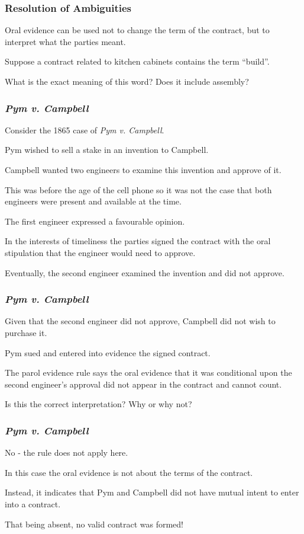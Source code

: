 \begin{frame}
\frametitle{Resolution of Ambiguities}

Oral evidence can be used not to change the term of the contract, but to interpret what the parties meant. 

Suppose a contract related to kitchen cabinets contains the term ``build''.

What is the exact meaning of this word? Does it include assembly? 

\end{frame}



\begin{frame}
\frametitle{\textit{Pym v. Campbell}}

Consider the 1865 case of \textit{Pym v. Campbell}.

Pym wished to sell a stake in an invention to Campbell. 

Campbell wanted two engineers to examine this invention and approve of it. 

This was before the age of the cell phone so it was not the case that both engineers were present and available at the time.

The first engineer expressed a favourable opinion.

In the interests of timeliness the parties signed the contract with the oral stipulation that the engineer would need to approve.

Eventually, the second engineer examined the invention and did not approve.

\end{frame}



\begin{frame}
\frametitle{\textit{Pym v. Campbell}}

Given that the second engineer did not approve, Campbell did not wish to purchase it.

Pym sued and entered into evidence the signed contract.

The parol evidence rule says the oral evidence that it was conditional upon the second engineer's approval did not appear in the contract and cannot count.

Is this the correct interpretation? Why or why not?

\end{frame}



\begin{frame}
\frametitle{\textit{Pym v. Campbell}}

No - the rule does not apply here. 

In this case the oral evidence is not about the terms of the contract.

Instead, it indicates that Pym and Campbell did not have mutual intent to enter into a contract.

That being absent, no valid contract was formed!

\end{frame}



